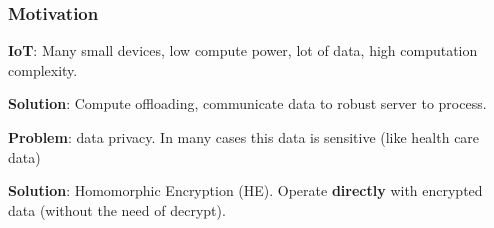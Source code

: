 \documentclass[10pt,handout]{beamer}
\begin{document}
\begin{frame}
    \frametitle{Motivation}

        \textbf{IoT}: Many small devices, low compute power, lot of data, high computation complexity.
    \vspace{-0.3cm}

        \textbf{Solution}: Compute offloading, communicate data to robust server to process.
    \vspace{-0.3cm}

\pause
        \textbf{Problem}: data privacy. In many cases this data is sensitive (like health care data)
    \vspace{-0.3cm}


\pause
          \textbf{Solution}: Homomorphic Encryption (HE). Operate \textbf{directly} with encrypted data (without the need of decrypt).
          \pause
\begin{columns}
\end{columns}
\end{frame}
\end{document}
